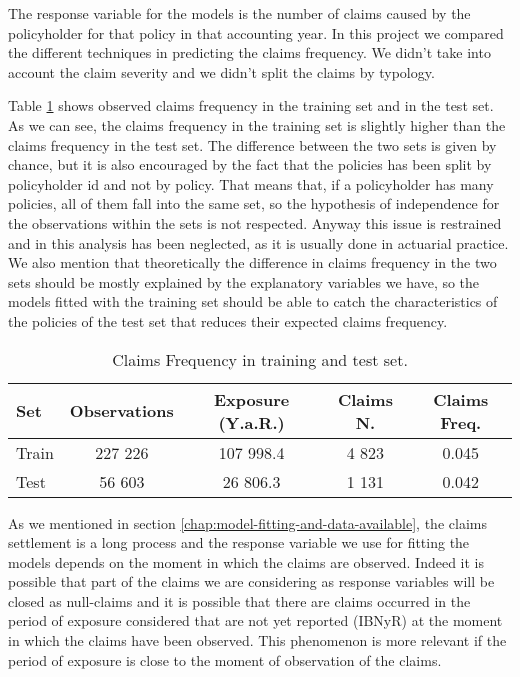 \documentclass[a4paper, nobind]{templates/ociamthesis}
\theoremstyle{definition}
\theoremstyle{definition}
\theoremstyle{definition}
\theoremstyle{remark}
\begin{document}
The response variable for the models is the number of claims caused by the policyholder for that policy in that accounting year. In this project we compared the different techniques in predicting the claims frequency. We didn't take into account the claim severity and we didn't split the claims by typology.

Table \ref{tab:freq-sin-train-test} shows observed claims frequency in the training set and in the test set. As we can see, the claims frequency in the training set is slightly higher than the claims frequency in the test set. The difference between the two sets is given by chance, but it is also encouraged by the fact that the policies has been split by policyholder id and not by policy. That means that, if a policyholder has many policies, all of them fall into the same set, so the hypothesis of independence for the observations within the sets is not respected. Anyway this issue is restrained and in this analysis has been neglected, as it is usually done in actuarial practice. We also mention that theoretically the difference in claims frequency in the two sets should be mostly explained by the explanatory variables we have, so the models fitted with the training set should be able to catch the characteristics of the policies of the test set that reduces their expected claims frequency.

\begin{table}[!h]

\caption{\label{tab:freq-sin-train-test}Claims Frequency in training and test set.}
\centering
\begin{tabular}[t]{lcccc}
\toprule
\textbf{Set} & \textbf{Observations} & \textbf{Exposure (Y.a.R.)} & \textbf{Claims N.} & \textbf{Claims Freq.}\\
\toprule\addlinespace
Train & 227 226 & 107 998.4 & 4 823 & 0.045\\
\addlinespace\hline\addlinespace
Test & 56 603 & 26 806.3 & 1 131 & 0.042\\
\bottomrule
\end{tabular}
\end{table}

As we mentioned in section \ref{chap:model-fitting-and-data-available}, the claims settlement is a long process and the response variable we use for fitting the models depends on the moment in which the claims are observed. Indeed it is possible that part of the claims we are considering as response variables will be closed as null-claims and it is possible that there are claims occurred in the period of exposure considered that are not yet reported (IBNyR) at the moment in which the claims have been observed. This phenomenon is more relevant if the period of exposure is close to the moment of observation of the claims.
\end{document}
